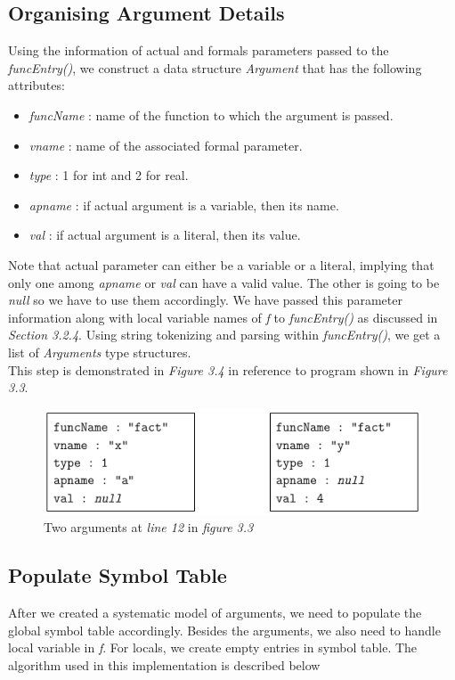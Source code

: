 \documentclass[12pt,oneside]{book}
\begin{document}
\subsection{Organising Argument Details}
Using the information of actual and formals parameters passed to the \textit{funcEntry()}, we construct a data structure \textit{Argument} that has the following attributes: 
\begin{itemize}
\setlength\itemsep{0em}
 \item \textit{funcName} : name of the function to which the argument is passed.
 \item \textit{vname} : name of the associated formal parameter.
  \item \textit{type} : 1 for int and 2 for real.
 \item \textit{apname} : if actual argument is a variable, then its name.
  \item \textit{val} : if actual argument is a literal, then its value. 
\end{itemize}
Note that actual parameter can either be a variable or a literal, implying that only one among \textit{apname} or \textit{val} can have a valid value. The other is going to be \textit{null} so we have to use them accordingly. We have passed this parameter information along with local variable names of \textit{f} to \textit{funcEntry()} as discussed in \textit{Section 3.2.4}. Using string tokenizing and parsing within \textit{funcEntry()}, we get a list of \textit{Arguments} type structures.\\
This step is demonstrated in \textit{Figure 3.4} in reference to program shown in \textit{Figure 3.3}.

\vspace{0.4cm}
\begin{figure}[htbp]
\centering
\includegraphics[scale=0.60]{arguments1.png}
\caption{Two arguments at \textit{line 12} in \textit{figure 3.3}}
\end{figure}


\subsection{Populate Symbol Table}
After we created a systematic model of arguments, we need to populate the global symbol table accordingly. Besides the arguments, we also need to handle local variable in \textit{f}. For locals, we create empty entries in symbol table. The algorithm used in this implementation is described below\\
\end{document}
